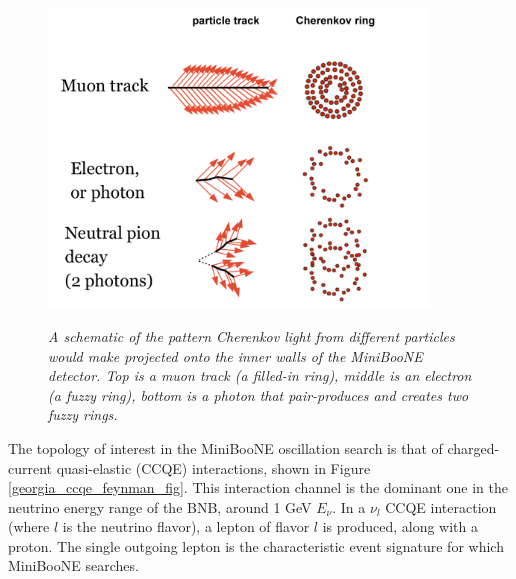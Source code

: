 \begin{figure}[ht!]
\centering
	\includegraphics[width=0.9\textwidth]{Figures/georgia_cherenkov_cartoon.png} \\
\caption{\textit{A schematic of the pattern Cherenkov light from different particles would make projected onto the inner walls of the MiniBooNE detector. Top is a muon track (a filled-in ring), middle is an electron (a fuzzy ring), bottom is a photon that pair-produces and creates two fuzzy rings.}}\label{georgia_cherenkov_cartoon_fig}
\end{figure}

The topology of interest in the MiniBooNE oscillation search is that of charged-current quasi-elastic (CCQE) interactions, shown in Figure \ref{georgia_ccqe_feynman_fig}. This interaction channel is the dominant one in the neutrino energy range of the BNB, around 1 GeV $E_\nu$. In a $\nu_l$ CCQE interaction (where $l$ is the neutrino flavor), a lepton of flavor $l$ is produced, along with a proton. The single outgoing lepton is the characteristic event signature for which MiniBooNE searches.\\


